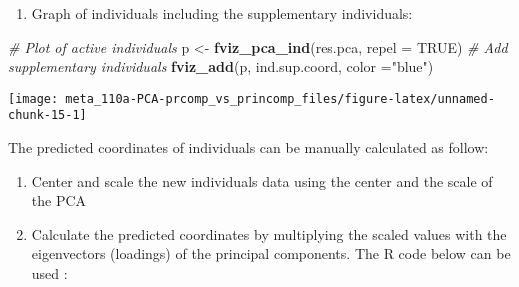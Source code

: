 \documentclass[]{book}
\newenvironment{Shaded}{\begin{snugshade}}{\end{snugshade}}
\newcommand{\CommentTok}[1]{\textcolor[rgb]{0.56,0.35,0.01}{\textit{#1}}}
\newcommand{\ControlFlowTok}[1]{\textcolor[rgb]{0.13,0.29,0.53}{\textbf{#1}}}
\newcommand{\DataTypeTok}[1]{\textcolor[rgb]{0.13,0.29,0.53}{#1}}
\newcommand{\DecValTok}[1]{\textcolor[rgb]{0.00,0.00,0.81}{#1}}
\newcommand{\KeywordTok}[1]{\textcolor[rgb]{0.13,0.29,0.53}{\textbf{#1}}}
\newcommand{\NormalTok}[1]{#1}
\newcommand{\OperatorTok}[1]{\textcolor[rgb]{0.81,0.36,0.00}{\textbf{#1}}}
\newcommand{\OtherTok}[1]{\textcolor[rgb]{0.56,0.35,0.01}{#1}}
\newcommand{\StringTok}[1]{\textcolor[rgb]{0.31,0.60,0.02}{#1}}
\providecommand{\tightlist}{%
  \setlength{\itemsep}{0pt}\setlength{\parskip}{0pt}}
\begin{document}
\begin{enumerate}
\def\labelenumi{\arabic{enumi}.}
\setcounter{enumi}{2}
\tightlist
\item
  Graph of individuals including the supplementary individuals:
\end{enumerate}

\begin{Shaded}
\begin{Highlighting}[]
\CommentTok{# Plot of active individuals}
\NormalTok{p <-}\StringTok{ }\KeywordTok{fviz_pca_ind}\NormalTok{(res.pca, }\DataTypeTok{repel =} \OtherTok{TRUE}\NormalTok{)}
\CommentTok{# Add supplementary individuals}
\KeywordTok{fviz_add}\NormalTok{(p, ind.sup.coord, }\DataTypeTok{color =}\StringTok{"blue"}\NormalTok{)}
\end{Highlighting}
\end{Shaded}

\begin{center}\texttt{[image: meta\_110a-PCA-prcomp\_vs\_princomp\_files/figure-latex/unnamed-chunk-15-1]} \end{center}

The predicted coordinates of individuals can be manually calculated as follow:

\begin{enumerate}
\def\labelenumi{\arabic{enumi}.}
\tightlist
\item
  Center and scale the new individuals data using the center and the scale of the PCA
\item
  Calculate the predicted coordinates by multiplying the scaled values with the eigenvectors (loadings) of the principal components.
  The R code below can be used :
\end{enumerate}

\begin{Shaded}
\end{Shaded}
\end{document}

